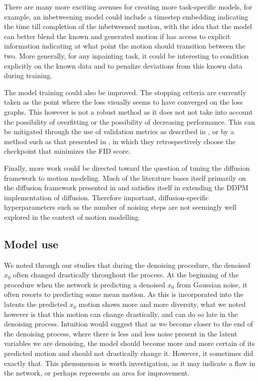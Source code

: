 There are many more exciting avenues for creating more task-specific models, for example, an inbetweening model could include a timestep embedding indicating the time till completion of the inbetweened motion, with the idea that the model can better blend the known and generated motion if has access to explicit information indicating at what point the motion should transition between the two. More generally, for any inpainting task, it could be interesting to condition explicitly on the known data and to penalize deviations from this known data during training.

The model training could also be improved. The stopping criteria are currently taken as the point where the loss visually seems to have converged on the loss graphs. This however is not a robust method as it does not not take into account the possibility of overfitting or the possibility of decreasing performance. This can be mitigated through the use of validation metrics as described in , or by a method such as that presented in \cite{MDM}, in which they retrospectively choose the checkpoint that minimizes the FID score.

Finally, more work could be directed toward the question of tuning the diffusion framework to motion modeling. Much of the literature \cite{EDGE,MDM,PhysDiff} bases itself primarily on the diffusion framework presented in \cite{ddpm} and satisfies itself in extending the DDPM implementation of diffusion. Therefore important, diffusion-specific hyperparameters such as the number of noising steps are not seemingly well explored in the context of motion modelling.

\subsection{Model use}

We noted through our studies that during the denoising procedure, the denoised $x_0$ often changed drastically throughout the process. At the beginning of the procedure when the network is predicting a denoised $x_0$ from Gaussian noise, it often resorts to predicting some mean motion. As this is incorporated into the latents the predicted $x_0$ motion shows more and more diversity, what we noted however is that this motion can change drastically, and can do so late in the denoising process. Intuition would suggest that as we become closer to the end of the denoising process, where there is less and less noise present in the latent variables we are denoising, the model should become more and more certain of its predicted motion and should not drastically change it. However, it sometimes did exactly that. This phenomenon is worth investigation, as it may indicate a flaw in the network, or perhaps represents an area for improvement.

